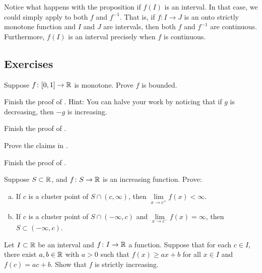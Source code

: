 Notice what happens with the proposition if $f(I)$ is an interval.
In that case, we could simply
apply  to both $f$ and $f^{-1}$.  That is, if
$f \colon I \to J$ is an onto strictly monotone function and $I$ and $J$ are intervals,
then both $f$ and $f^{-1}$ are continuous.  Furthermore, $f(I)$ is an
interval precisely when $f$ is continuous.

\subsection{Exercises}

\begin{exercise}
Suppose $f \colon [0,1] \to {\mathbb{R}}$ is monotone.  Prove $f$ is bounded.
\end{exercise}

\begin{exercise}
Finish the proof of .
Hint: You can halve your work by noticing that if $g$ is decreasing,
then $-g$ is increasing.
\end{exercise}

\begin{exercise}
Finish the proof of .
\end{exercise}

\begin{exercise}
Prove the claims in .
\end{exercise}

\begin{exercise}
Finish the proof of .
\end{exercise}

\begin{samepage}
\begin{exercise}
Suppose $S \subset {\mathbb{R}}$, and $f \colon S \to {\mathbb{R}}$ is an increasing
function.  Prove:
\begin{enumerate}[a)]
\item
If $c$ is a cluster point
of $S \cap (c,\infty)$, then
$\lim\limits_{x\to c^+} f(x) < \infty$.
\item
If $c$ is a cluster point of $S \cap (-\infty,c)$
and $\lim\limits_{x\to c^-} f(x) = \infty$, then
$S \subset (-\infty,c)$.
\end{enumerate}
\end{exercise}
\end{samepage}

\begin{exercise}
Let $I \subset {\mathbb{R}}$ be an interval and $f \colon I \to {\mathbb{R}}$ a function.
Suppose that for each $c \in I$, there exist $a, b \in {\mathbb{R}}$ with
$a > 0$ such that $f(x) \geq a x + b$ for all $x \in I$
and $f(c) = a c + b$.  Show that $f$ is strictly increasing.
\end{exercise}


